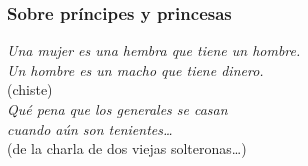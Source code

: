 \protect\hypertarget{M10}{}{}

\hypertarget{sobre-pruxedncipes-y-princesas}{\subsubsection{Sobre príncipes y princesas}
\label{sobre-pruxedncipes-y-princesas}}

\noindent
\textit{Una mujer es una hembra que tiene un hombre.}\\
\textit{Un hombre es un macho que tiene dinero.}\\
(chiste)\\

\noindent
\textit{Qué pena que los generales se casan}\\
\textit{cuando aún son tenientes\ldots{}}\\
(de la charla de dos viejas solteronas\ldots{})\\

